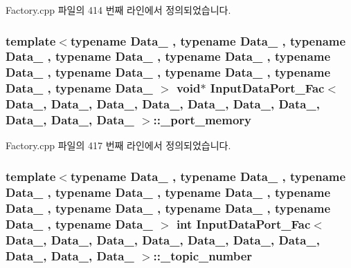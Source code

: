 Factory.\+cpp 파일의 414 번째 라인에서 정의되었습니다.

\subsubsection[{\texorpdfstring{\+\_\+port\+\_\+memory}{_port_memory}}]{\setlength{\rightskip}{0pt plus 5cm}template$<$typename Data\+\_ , typename Data\+\_ , typename Data\+\_ , typename Data\+\_ , typename Data\+\_ , typename Data\+\_ , typename Data\+\_ , typename Data\+\_ , typename Data\+\_ , typename Data\+\_ $>$ void$\ast$ {\bf Input\+Data\+Port\+\_\+\+Fac}$<$ Data\+\_, Data\+\_, Data\+\_, Data\+\_, Data\+\_, Data\+\_, Data\+\_, Data\+\_, Data\+\_, Data\+\_ $>$\+::\+\_\+port\+\_\+memory\hspace{0.3cm}{\ttfamily [private]}}\hypertarget{classInputDataPort__Fac_a6c10484e54395bef3479ae6d1bbab04d}{}\label{classInputDataPort__Fac_a6c10484e54395bef3479ae6d1bbab04d}


Factory.\+cpp 파일의 417 번째 라인에서 정의되었습니다.

\subsubsection[{\texorpdfstring{\+\_\+topic\+\_\+number}{_topic_number}}]{\setlength{\rightskip}{0pt plus 5cm}template$<$typename Data\+\_ , typename Data\+\_ , typename Data\+\_ , typename Data\+\_ , typename Data\+\_ , typename Data\+\_ , typename Data\+\_ , typename Data\+\_ , typename Data\+\_ , typename Data\+\_ $>$ int {\bf Input\+Data\+Port\+\_\+\+Fac}$<$ Data\+\_, Data\+\_, Data\+\_, Data\+\_, Data\+\_, Data\+\_, Data\+\_, Data\+\_, Data\+\_, Data\+\_ $>$\+::\+\_\+topic\+\_\+number\hspace{0.3cm}{\ttfamily [private]}}\hypertarget{classInputDataPort__Fac_ad39fee414d67b42e824bad1a16a3bd87}{}\label{classInputDataPort__Fac_ad39fee414d67b42e824bad1a16a3bd87}


